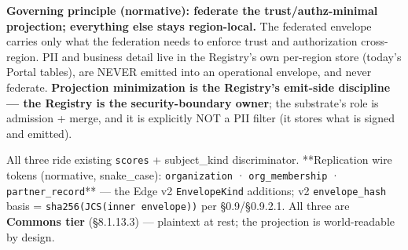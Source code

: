 \documentclass[10pt]{article}
\begin{document}
\textbf{Governing principle (normative): federate the trust/authz-minimal projection; everything else stays region-local.} The federated envelope carries only what the federation needs to enforce trust and authorization cross-region. PII and business detail live in the Registry's own per-region store (today's Portal tables), are NEVER emitted into an operational envelope, and never federate. \textbf{Projection minimization is the Registry's emit-side discipline — the Registry is the security-boundary owner}; the substrate's role is admission + merge, and it is explicitly NOT a PII filter (it stores what is signed and emitted).


All three ride existing \texttt{scores} + subject\_kind discriminator. **Replication wire tokens (normative, snake\_case): \texttt{organization} · \texttt{org\_membership} · \texttt{partner\_record}** — the Edge v2 \texttt{EnvelopeKind} additions; v2 \texttt{envelope\_hash} basis = \texttt{sha256(JCS(inner envelope))} per §0.9/§0.9.2.1. All three are \textbf{Commons tier} (§8.1.13.3) — plaintext at rest; the projection is world-readable by design.
\end{document}
